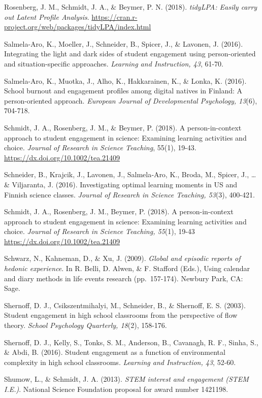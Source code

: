 \documentclass[]{msu-thesis}
\theoremstyle{definition}
\theoremstyle{definition}
\theoremstyle{definition}
\theoremstyle{remark}
\begin{document}
Rosenberg, J. M., Schmidt, J. A., \& Beymer, P. N. (2018).
\emph{tidyLPA: Easily carry out Latent Profile Analysis}.
\url{https://cran.r-project.org/web/packages/tidyLPA/index.html}

Salmela-Aro, K., Moeller, J., Schneider, B., Spicer, J., \& Lavonen, J.
(2016). Integrating the light and dark sides of student engagement using
person-oriented and situation-specific approaches. \emph{Learning and
Instruction, 43}, 61-70.

Salmela-Aro, K., Muotka, J., Alho, K., Hakkarainen, K., \& Lonka, K.
(2016). School burnout and engagement profiles among digital natives in
Finland: A person-oriented approach. \emph{European Journal of
Developmental Psychology, 13}(6), 704-718.

Schmidt, J. A., Rosenberg, J. M., \& Beymer, P. (2018). A
person-in-context approach to student engagement in science: Examining
learning activities and choice. \emph{Journal of Research in Science
Teaching}, 55(1), 19-43. \url{https://dx.doi.org/10.1002/tea.21409}

Schneider, B., Krajcik, J., Lavonen, J., Salmela‐Aro, K., Broda, M.,
Spicer, J., \ldots{} \& Viljaranta, J. (2016). Investigating optimal
learning moments in US and Finnish science classes. \emph{Journal of
Research in Science Teaching, 53}(3), 400-421.

Schmidt, J. A., Rosenberg, J. M., Beymer, P. (2018). A person-in-context
approach to student engagement in science: Examining learning activities
and choice. \emph{Journal of Research in Science Teaching, 55}(1), 19-43
\url{https://dx.doi.org/10.1002/tea.21409}

Schwarz, N., Kahneman, D., \& Xu, J. (2009). \emph{Global and episodic
reports of hedonic experience}. In R. Belli, D. Alwen, \& F. Stafford
(Eds.), Using calendar and diary methods in life events research
(pp.~157-174). Newbury Park, CA: Sage.

Shernoff, D. J., Csikszentmihalyi, M., Schneider, B., \& Shernoff, E. S.
(2003). Student engagement in high school classrooms from the
perspective of flow theory. \emph{School Psychology Quarterly, 18}(2),
158-176.

Shernoff, D. J., Kelly, S., Tonks, S. M., Anderson, B., Cavanagh, R. F.,
Sinha, S., \& Abdi, B. (2016). Student engagement as a function of
environmental complexity in high school classrooms. \emph{Learning and
Instruction, 43}, 52-60.

Shumow, L., \& Schmidt, J. A. (2013). \emph{STEM interest and engagement
(STEM I.E.)}. National Science Foundation proposal for award number
1421198.
\end{document}

